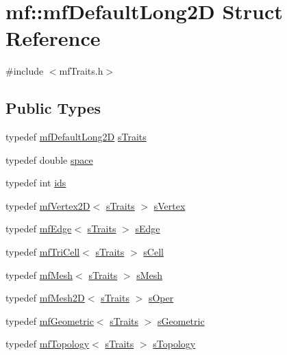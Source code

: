 \hypertarget{structmf_1_1mfDefaultLong2D}{
\section{mf::mfDefaultLong2D Struct Reference}
\label{structmf_1_1mfDefaultLong2D}
}


{\ttfamily \#include $<$mfTraits.h$>$}

\subsection*{Public Types}
\begin{DoxyCompactItemize}
\item 
typedef \hyperlink{structmf_1_1mfDefaultLong2D}{mfDefaultLong2D} \hyperlink{structmf_1_1mfDefaultLong2D_abfeb7f123426df4ccc4af7c4ee294680}{sTraits}
\item 
typedef double \hyperlink{structmf_1_1mfDefaultLong2D_a7010255ab9efbc1c3760ebb1b26df7ab}{space}
\item 
typedef int \hyperlink{structmf_1_1mfDefaultLong2D_a6f6d35da9a8b9da95d234e5cdb611000}{ids}
\item 
typedef \hyperlink{classmf_1_1mfVertex2D}{mfVertex2D}$<$ \hyperlink{structmf_1_1mfDefaultLong2D}{sTraits} $>$ \hyperlink{structmf_1_1mfDefaultLong2D_a240fc233dce3b1468d48d55d770cfdb6}{sVertex}
\item 
typedef \hyperlink{classmf_1_1mfEdge}{mfEdge}$<$ \hyperlink{structmf_1_1mfDefaultLong2D}{sTraits} $>$ \hyperlink{structmf_1_1mfDefaultLong2D_aa36c3fbc0e11ba06bd957e272d23030d}{sEdge}
\item 
typedef \hyperlink{classmf_1_1mfTriCell}{mfTriCell}$<$ \hyperlink{structmf_1_1mfDefaultLong2D}{sTraits} $>$ \hyperlink{structmf_1_1mfDefaultLong2D_a93ac50a18a452a443b21b746d039df7d}{sCell}
\item 
typedef \hyperlink{classmf_1_1mfMesh}{mfMesh}$<$ \hyperlink{structmf_1_1mfDefaultLong2D}{sTraits} $>$ \hyperlink{structmf_1_1mfDefaultLong2D_af343d9f5a2e8f7c633a0363b018892ce}{sMesh}
\item 
typedef \hyperlink{classmf_1_1mfMesh2D}{mfMesh2D}$<$ \hyperlink{structmf_1_1mfDefaultLong2D}{sTraits} $>$ \hyperlink{structmf_1_1mfDefaultLong2D_a28659b4baf6e65094669073068626fae}{sOper}
\item 
typedef \hyperlink{classmf_1_1mfGeometric}{mfGeometric}$<$ \hyperlink{structmf_1_1mfDefaultLong2D}{sTraits} $>$ \hyperlink{structmf_1_1mfDefaultLong2D_aa689949101848a8cc3ec832e0ddab81b}{sGeometric}
\item 
typedef \hyperlink{classmf_1_1mfTopology}{mfTopology}$<$ \hyperlink{structmf_1_1mfDefaultLong2D}{sTraits} $>$ \hyperlink{structmf_1_1mfDefaultLong2D_a53139dd43bad6fbea119cfe3877ea2de}{sTopology}
\end{DoxyCompactItemize}


